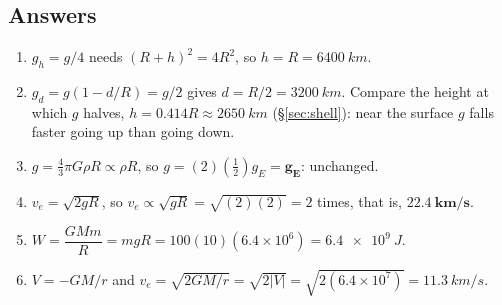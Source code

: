 \subsection*{Answers}
{\small
\begin{enumerate}[itemsep=2pt]
\item $g_h=g/4$ needs $(R+h)^{2}=4R^{2}$, so $h=R=\SI{6400}{km}$.
\item $g_d=g(1-d/R)=g/2$ gives $d=R/2=\SI{3200}{km}$. Compare the height at which $g$ halves,
$h=0.414R\approx\SI{2650}{km}$ (\S\ref{sec:shell}): near the surface $g$ falls faster going up than
going down.
\item $g=\tfrac{4}{3}\pi G\rho R\propto\rho R$, so $g=(2)(\tfrac{1}{2})g_E=\mathbf{g_E}$: unchanged.
\item $v_e=\sqrt{2gR}$, so $v_e\propto\sqrt{gR}=\sqrt{(2)(2)}=2$ times, that is,
$\mathbf{\SI{22.4}{km/s}}$.
\item $W=\dfrac{GMm}{R}=mgR=100(10)(6.4\times10^{6})=\SI{6.4e9}{J}$.
\item $V=-GM/r$ and $v_e=\sqrt{2GM/r}=\sqrt{2|V|}=\sqrt{2(6.4\times10^{7})}
=\SI{11.3}{km/s}$.
\end{enumerate}
}
